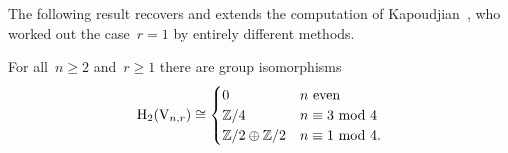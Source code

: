 
The following result recovers and extends the computation of Kapoudjian~\cite{Kapoudjian}, who worked out the case~$r=1$ by entirely different methods.

\begin{proposition}\label{prop:H2}
For all~$n\geqslant 2$ and~$r\geqslant1$ there are group isomorphisms
\[
\mathrm{H}_2(\mathrm{V}_{n,r})\cong
\begin{cases}
0						& n\text{ even}\\
\mathbb{Z}/4 					& n\equiv 3\text{ mod }4\\
\mathbb{Z}/2\oplus\mathbb{Z}/2 		& n\equiv 1\text{ mod }4.
\end{cases}
\]
\end{proposition}

